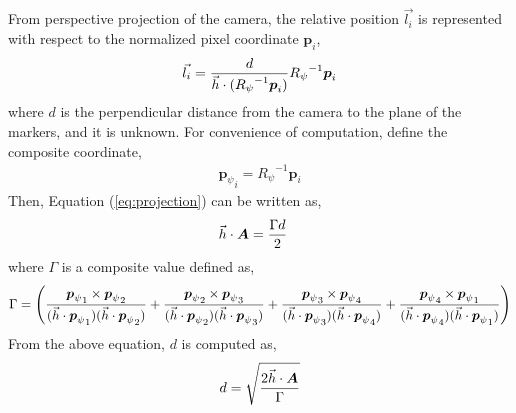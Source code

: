 From perspective projection of the camera, the relative position \(\vec{l_i}\) is represented with respect to the normalized pixel coordinate \( {\boldsymbol p}_i\), \\
\begin{equation}
\begin{aligned}
\vec{l_i} =  {d\over {\vec{h} \cdot ({R_{\psi}}^{-1} {\boldsymbol p}_i}) } {R_{\psi}}^{-1} {\boldsymbol p}_i 
\end{aligned}
\end{equation}
where \( d \) is the perpendicular distance from the camera to the plane of the markers, and it is unknown. For convenience of computation, define the composite coordinate,\\
\begin{equation}
\begin{aligned}
{{\boldsymbol p}_{\psi}}_i = {R_{\psi}}^{-1} {\boldsymbol p}_i 
\end{aligned}
\end{equation}
Then, Equation (\ref{eq:projection}) can be written as, \\
\begin{equation}
\begin{aligned}
{\vec h} \cdot { \boldsymbol A} & = {{ \Gamma d} \over 2} 
\end{aligned}
\end{equation}
where \(\Gamma \) is a composite value defined as,\\
\begin{equation}
\begin{aligned}
\Gamma = 
\left(
{{{{{\boldsymbol p}_{\psi}}_1} \times {{{\boldsymbol p}_{\psi}}_2}} \over {({\vec{h} \cdot {{\boldsymbol p}_{\psi}}_1})({\vec{h} \cdot {{\boldsymbol p}_{\psi}}_2})}} + 
{{{{{\boldsymbol p}_{\psi}}_2} \times {{{\boldsymbol p}_{\psi}}_3}} \over {({\vec{h} \cdot {{\boldsymbol p}_{\psi}}_2})({\vec{h} \cdot {{\boldsymbol p}_{\psi}}_3})}} +
{{{{{\boldsymbol p}_{\psi}}_3} \times {{{\boldsymbol p}_{\psi}}_4}} \over {({\vec{h} \cdot {{\boldsymbol p}_{\psi}}_3})({\vec{h} \cdot {{\boldsymbol p}_{\psi}}_4})}} +
{{{{{\boldsymbol p}_{\psi}}_4} \times {{{\boldsymbol p}_{\psi}}_1}} \over {({\vec{h} \cdot {{\boldsymbol p}_{\psi}}_4})({\vec{h} \cdot {{\boldsymbol p}_{\psi}}_1})}} \right) 
\end{aligned}
\end{equation}
From the above equation, \( d \) is computed as,\\
\begin{equation}
\begin{aligned}
{d} = \sqrt{{2 {\vec h} \cdot { \boldsymbol A} }\over{\Gamma}} 
\end{aligned}
\end{equation}
